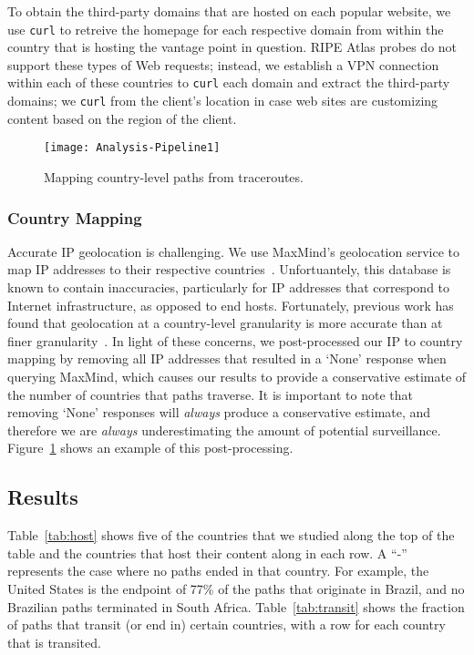 To obtain the third-party domains that are hosted on each popular website, we
use {\tt curl} to retreive the homepage for each respective domain from within
the country that is hosting the vantage point in question.  RIPE Atlas probes
do not support these types of Web requests; instead, we establish a VPN
connection within each of these countries to {\tt curl} each domain and
extract the third-party domains; we {\tt curl} from the client's location in
case web sites are customizing content based on the region of the client.

\begin{figure}[t]
\centering
\texttt{[image: Analysis-Pipeline1]}
\caption{Mapping country-level paths from traceroutes.}
\label{fig:analysis_pipeline}
\end{figure}


\subsubsection{Country Mapping}
\label{c_map}

Accurate IP geolocation is challenging. We use MaxMind's
geolocation service to map IP addresses to their respective
countries~\cite{maxmind}. Unfortuantely, this database is known to contain inaccuracies,
particularly for IP addresses that correspond to Internet infrastructure, as opposed
to end hosts.
Fortunately, previous
work has found that
geolocation at a country-level granularity is more accurate than at
finer granularity~\cite{huffaker2011geocompare}.  In light of these
concerns, we post-processed our IP to country mapping
by removing all IP addresses that resulted in a `None' response when
querying MaxMind, which causes our results to provide a conservative
estimate of the number of countries that paths traverse. It is important
to note that removing `None' responses will \textit{always} produce a
conservative estimate, and therefore we are \textit{always}
underestimating the amount of potential surveillance.  
Figure~\ref{fig:analysis_pipeline} shows an example of this
post-processing. 

\subsection{Results}



Table~\ref{tab:host} shows five of the countries that we studied along the top
of the table and the countries that host their content along in each row.  A
``-'' represents the case where no paths ended in that country. For example,
the United States is the endpoint of 77\% of the paths that originate in
Brazil, and no Brazilian paths terminated in South Africa.
Table~\ref{tab:transit} shows the fraction of paths that transit (or end in)
certain countries, with a row for each country that is transited.

